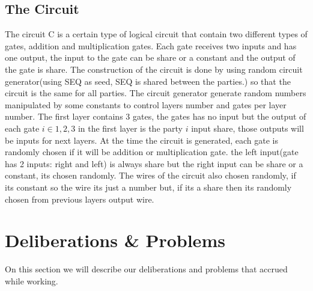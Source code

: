 \documentclass[12pt]{article}
\begin{document}
\subsection{The Circuit}
The circuit C is a certain type of logical circuit that contain two different types of gates, addition and multiplication gates. Each gate receives two inputs and has one output, the input to the gate can be share or a constant and the output of the gate is share. The construction of the circuit is done by using random circuit generator(using SEQ as seed, SEQ is shared between the parties.) so that the circuit is the same for all parties.
The circuit generator generate random numbers manipulated by some constants to control layers number and gates per layer number.
The first layer contains 3 gates, the gates has no input but the output of each gate $i \in{1,2,3}$ in the first layer is the party $i$ input share, those outputs will be inputs for next layers. At the time the circuit is generated, each gate is randomly chosen if it will be addition or multiplication gate. the left input(gate has 2 inputs: right and left) is always share but the right input can be share or a constant, its chosen randomly. The wires of the circuit also chosen randomly, if its constant so the wire its just a number but, if its a share then its randomly chosen from previous layers output wire.

\section{Deliberations \& Problems}
On this section we will describe our deliberations and problems that accrued while working.
\hfill\break\hfill\break
\end{document}
